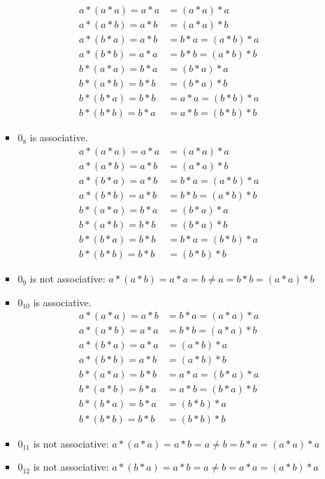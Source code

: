 \begin{enumerate}[label={\Alph*.},font={\bfseries}]
\begin{enumerate}[label={\arabic*},font={\bfseries}]
\begin{itemize}
      \begin{align*}
        a*(a*a) = a*a &= (a*a)*a \\
        a*(a*b) = a*b &= (a*a)*b \\
        a*(b*a) = a*b &= b*a = (a*b)*a \\
        a*(b*b) = a*a &= b*b = (a*b)*b \\
        b*(a*a) = b*a &= (b*a)*a \\
        b*(a*b) = b*b &= (b*a)*b \\
        b*(b*a) = b*b &= a*a = (b*b)*a \\
        b*(b*b) = b*a &= a*b = (b*b)*b
      \end{align*}
    \item $0_8$ is associative.
      \begin{align*}
        a*(a*a) = a*a &= (a*a)*a \\
        a*(a*b) = a*b &= (a*a)*b \\
        a*(b*a) = a*b &= b*a = (a*b)*a \\
        a*(b*b) = a*b &= b*b = (a*b)*b \\
        b*(a*a) = b*a &= (b*a)*a \\
        b*(a*b) = b*b &= (b*a)*b \\
        b*(b*a) = b*b &= b*a = (b*b)*a \\
        b*(b*b) = b*b &= (b*b)*b
      \end{align*}
    \item $0_9$ is not associative: $a*(a*b)=a*a=b \neq a=b*b=(a*a)*b$
    \item $0_{10}$ is associative.
      \begin{align*}
        a*(a*a) = a*b &= b*a = (a*a)*a \\
        a*(a*b) = a*a &= b*b = (a*a)*b \\
        a*(b*a) = a*a &= (a*b)*a \\
        a*(b*b) = a*b &= (a*b)*b \\
        b*(a*a) = b*b &= a*a = (b*a)*a \\
        b*(a*b) = b*a &= a*b = (b*a)*b \\
        b*(b*a) = b*a &= (b*b)*a \\
        b*(b*b) = b*b &= (b*b)*b
      \end{align*}
    \item $0_{11}$ is not associative: $a*(a*a)=a*b=a \neq b=b*a=(a*a)*a$
    \item $0_{12}$ is not associative: $a*(b*a)=a*b=a \neq b=a*a=(a*b)*a$

\end{itemize}
\end{enumerate}
\end{enumerate}
